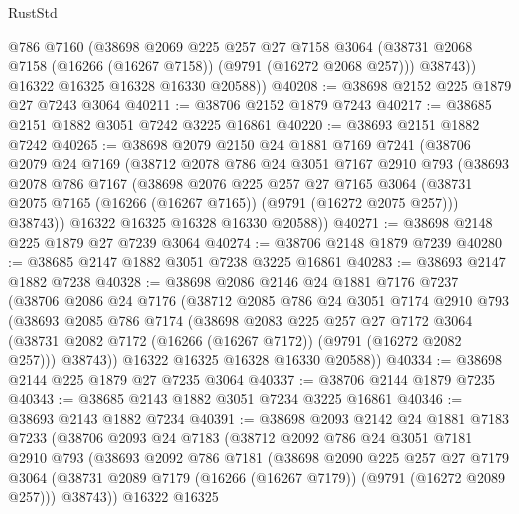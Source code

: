 \begin{lexlean}{RustStd}
\begin{coremodule}
          @786
          @7160
          (@38698
            @2069
            @225
            @257
            @27
            @7158
            @3064
            (@38731 @2068 @7158 (@16266 (@16267 @7158)) (@9791 (@16272 @2068 @257)))
            @38743))
        @16322
        @16325
        @16328
        @16330
        @20588))
@40208 := @38698 @2152 @225 @1879 @27 @7243 @3064
@40211 := @38706 @2152 @1879 @7243
@40217 := @38685 @2151 @1882 @3051 @7242 @3225 @16861
@40220 := @38693 @2151 @1882 @7242
@40265 := @38698
    @2079
    @2150
    @24
    @1881
    @7169
    @7241
    (@38706
      @2079
      @24
      @7169
      (@38712
        @2078
        @786
        @24
        @3051
        @7167
        @2910
        @793
        (@38693
          @2078
          @786
          @7167
          (@38698
            @2076
            @225
            @257
            @27
            @7165
            @3064
            (@38731 @2075 @7165 (@16266 (@16267 @7165)) (@9791 (@16272 @2075 @257)))
            @38743))
        @16322
        @16325
        @16328
        @16330
        @20588))
@40271 := @38698 @2148 @225 @1879 @27 @7239 @3064
@40274 := @38706 @2148 @1879 @7239
@40280 := @38685 @2147 @1882 @3051 @7238 @3225 @16861
@40283 := @38693 @2147 @1882 @7238
@40328 := @38698
    @2086
    @2146
    @24
    @1881
    @7176
    @7237
    (@38706
      @2086
      @24
      @7176
      (@38712
        @2085
        @786
        @24
        @3051
        @7174
        @2910
        @793
        (@38693
          @2085
          @786
          @7174
          (@38698
            @2083
            @225
            @257
            @27
            @7172
            @3064
            (@38731 @2082 @7172 (@16266 (@16267 @7172)) (@9791 (@16272 @2082 @257)))
            @38743))
        @16322
        @16325
        @16328
        @16330
        @20588))
@40334 := @38698 @2144 @225 @1879 @27 @7235 @3064
@40337 := @38706 @2144 @1879 @7235
@40343 := @38685 @2143 @1882 @3051 @7234 @3225 @16861
@40346 := @38693 @2143 @1882 @7234
@40391 := @38698
    @2093
    @2142
    @24
    @1881
    @7183
    @7233
    (@38706
      @2093
      @24
      @7183
      (@38712
        @2092
        @786
        @24
        @3051
        @7181
        @2910
        @793
        (@38693
          @2092
          @786
          @7181
          (@38698
            @2090
            @225
            @257
            @27
            @7179
            @3064
            (@38731 @2089 @7179 (@16266 (@16267 @7179)) (@9791 (@16272 @2089 @257)))
            @38743))
        @16322
        @16325

\end{coremodule}
\end{lexlean}
